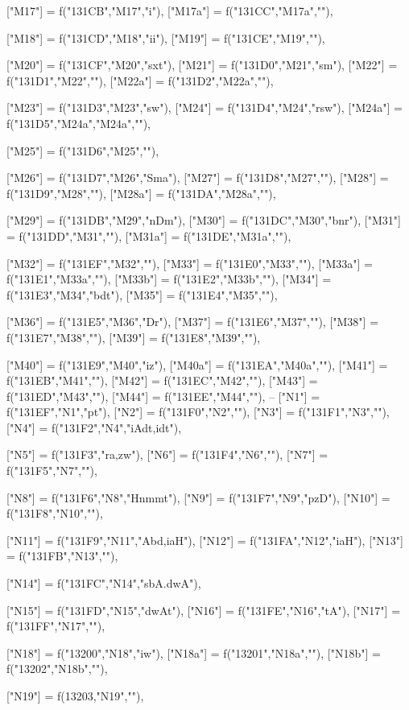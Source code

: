 \documentclass{article}
\begin{document}
\begin{luacode*}
{	["M17"] = f("131CB","M17","i"),
	["M17a"] = f("131CC","M17a",""),

	["M18"] = f("131CD","M18","ii"),
	["M19"] = f("131CE","M19",""),

	["M20"] = f("131CF","M20","sxt"),
	["M21"] = f("131D0","M21","sm"),
	["M22"] = f("131D1","M22",""),
	["M22a"] = f("131D2","M22a",""),

	["M23"] = f("131D3","M23","sw"),
	["M24"] = f("131D4","M24","rsw"),
	["M24a"] = f("131D5","M24a","M24a",""),

	["M25"] = f("131D6","M25",""),

	["M26"] = f("131D7","M26","Sma"),
	["M27"] = f("131D8","M27",""),
	["M28"] = f("131D9","M28",""),
	["M28a"] = f("131DA","M28a",""),

	["M29"] = f("131DB","M29","nDm"),
	["M30"] = f("131DC","M30","bnr"),
	["M31"] = f("131DD","M31",""),
	["M31a"] = f("131DE","M31a",""),

	["M32"] = f("131EF","M32",""),
	["M33"] = f("131E0","M33",""),
	["M33a"] = f("131E1","M33a",""),
["M33b"] = f("131E2","M33b",""),
	["M34"] = f("131E3","M34","bdt"),
	["M35"] = f("131E4","M35",""),

	["M36"] = f("131E5","M36","Dr"),
	["M37"] = f("131E6","M37",""),
	["M38"] = f("131E7","M38",""),
	["M39"] = f("131E8","M39",""),


	["M40"] = f("131E9","M40","iz"),
	["M40a"] = f("131EA","M40a",""),
	["M41"] = f("131EB","M41",""),
	["M42"] = f("131EC","M42",""),
	["M43"] = f("131ED","M43",""),
	["M44"] = f("131EE","M44",""),
--
	["N1"] = f("131EF","N1","pt"),
	["N2"] = f("131F0","N2",""),
	["N3"] = f("131F1","N3",""),
	["N4"] = f("131F2","N4","iAdt,idt"),

	["N5"] = f("131F3","ra,zw"),
	["N6"] = f("131F4","N6",""),
	["N7"] = f("131F5","N7",""),

	["N8"] = f("131F6","N8","Hnmmt"),
	["N9"] = f("131F7","N9","pzD"),
	["N10"] = f("131F8","N10",""),



	["N11"] = f("131F9","N11","Abd,iaH"),
	["N12"] = f("131FA","N12","iaH"),
	["N13"] = f("131FB","N13",""),

	["N14"] = f("131FC","N14","sbA.dwA"),

	["N15"] = f("131FD","N15","dwAt"),
	["N16"] = f("131FE","N16","tA"),
	["N17"] = f("131FF","N17",""),

	["N18"] = f("13200","N18","iw"),
	["N18a"] = f("13201","N18a",""),
	["N18b"] = f("13202","N18b",""),

	["N19"] = f(13203,"N19",""),

}
\end{luacode*}
\end{document}
